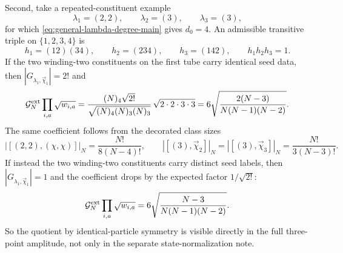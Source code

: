 \documentclass[11pt]{article}
\newcommand{\mc}[1]{\mathcal{#1}}
\begin{document}
Second, take a repeated-constituent example
\begin{equation}\label{eq:repeated-profile-example-data}
\lambda_1=(2,2),
\qquad
\lambda_2=(3),
\qquad
\lambda_3=(3),
\end{equation}
for which \eqref{eq:general-lambda-degree-main} gives $d_0=4$. An admissible transitive triple on $\{1,2,3,4\}$ is
\begin{equation}\label{eq:repeated-profile-example-monodromy}
h_1=(12)(34),
\qquad
h_2=(234),
\qquad
h_3=(142),
\qquad
h_1h_2h_3=1.
\end{equation}
If the two winding-two constituents on the first tube carry identical seed data, then $|G_{\lambda_1,\vec\chi_1}|=2!$ and
\begin{equation}\label{eq:repeated-profile-identical-factor}
\mc G_N^{\rm ext}\prod_{i,a}\sqrt{w_{i,a}}
=
\frac{(N)_4\sqrt{2!}}{\sqrt{(N)_4(N)_3(N)_3}}\,
\sqrt{2\cdot 2\cdot 3\cdot 3}
=
6\sqrt{\frac{2(N-3)}{N(N-1)(N-2)}}.
\end{equation}
The same coefficient follows from the decorated class sizes
\[
|[(2,2),(\chi,\chi)]|_N=\frac{N!}{8(N-4)!},
\qquad
|[(3),\vec\chi_2]|_N=|[(3),\vec\chi_3]|_N=\frac{N!}{3(N-3)!}.
\]
If instead the two winding-two constituents carry distinct seed labels, then $|G_{\lambda_1,\vec\chi_1}|=1$ and the coefficient drops by the expected factor $1/\sqrt{2!}$:
\begin{equation}\label{eq:repeated-profile-distinct-factor}
\mc G_N^{\rm ext}\prod_{i,a}\sqrt{w_{i,a}}
=
6\sqrt{\frac{N-3}{N(N-1)(N-2)}}.
\end{equation}
So the quotient by identical-particle symmetry is visible directly in the full three-point amplitude, not only in the separate state-normalization note.
\end{document}
